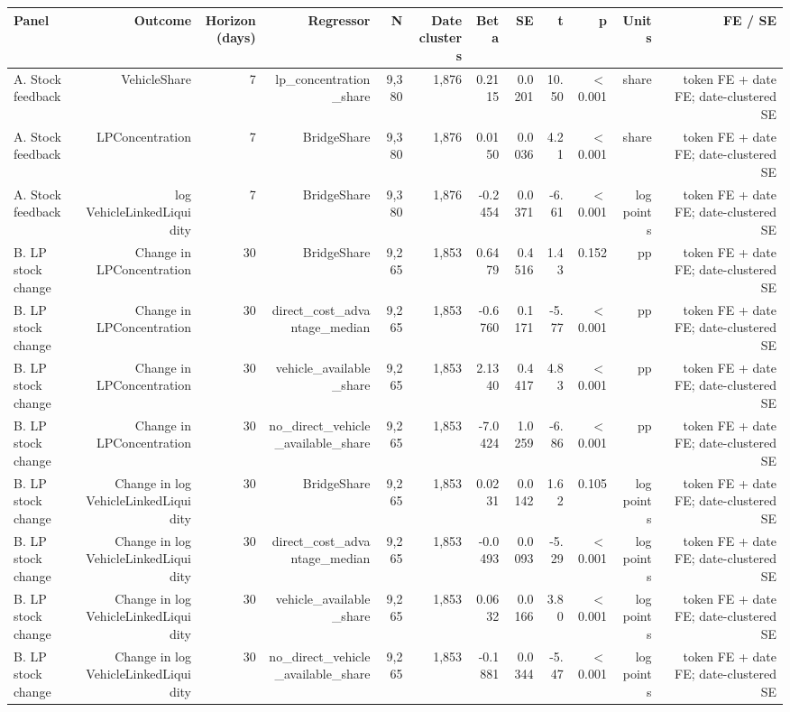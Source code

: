 \begin{tabular}{lrrrrrrrrrrr}
\toprule
Panel & Outcome & Horizon (days) & Regressor & N & Date clusters & Beta & SE & t & p & Units & FE / SE \\
\midrule
A. Stock feedback & VehicleShare & 7 & lp\_concentration\_share & 9,380 & 1,876 & 0.2115 & 0.0201 & 10.50 & \ensuremath{<}0.001 & share & token FE + date FE; date-clustered SE \\
A. Stock feedback & LPConcentration & 7 & BridgeShare & 9,380 & 1,876 & 0.0150 & 0.0036 & 4.21 & \ensuremath{<}0.001 & share & token FE + date FE; date-clustered SE \\
A. Stock feedback & log VehicleLinkedLiquidity & 7 & BridgeShare & 9,380 & 1,876 & -0.2454 & 0.0371 & -6.61 & \ensuremath{<}0.001 & log points & token FE + date FE; date-clustered SE \\
B. LP stock change & Change in LPConcentration & 30 & BridgeShare & 9,265 & 1,853 & 0.6479 & 0.4516 & 1.43 & 0.152 & pp & token FE + date FE; date-clustered SE \\
B. LP stock change & Change in LPConcentration & 30 & direct\_cost\_advantage\_median & 9,265 & 1,853 & -0.6760 & 0.1171 & -5.77 & \ensuremath{<}0.001 & pp & token FE + date FE; date-clustered SE \\
B. LP stock change & Change in LPConcentration & 30 & vehicle\_available\_share & 9,265 & 1,853 & 2.1340 & 0.4417 & 4.83 & \ensuremath{<}0.001 & pp & token FE + date FE; date-clustered SE \\
B. LP stock change & Change in LPConcentration & 30 & no\_direct\_vehicle\_available\_share & 9,265 & 1,853 & -7.0424 & 1.0259 & -6.86 & \ensuremath{<}0.001 & pp & token FE + date FE; date-clustered SE \\
B. LP stock change & Change in log VehicleLinkedLiquidity & 30 & BridgeShare & 9,265 & 1,853 & 0.0231 & 0.0142 & 1.62 & 0.105 & log points & token FE + date FE; date-clustered SE \\
B. LP stock change & Change in log VehicleLinkedLiquidity & 30 & direct\_cost\_advantage\_median & 9,265 & 1,853 & -0.0493 & 0.0093 & -5.29 & \ensuremath{<}0.001 & log points & token FE + date FE; date-clustered SE \\
B. LP stock change & Change in log VehicleLinkedLiquidity & 30 & vehicle\_available\_share & 9,265 & 1,853 & 0.0632 & 0.0166 & 3.80 & \ensuremath{<}0.001 & log points & token FE + date FE; date-clustered SE \\
B. LP stock change & Change in log VehicleLinkedLiquidity & 30 & no\_direct\_vehicle\_available\_share & 9,265 & 1,853 & -0.1881 & 0.0344 & -5.47 & \ensuremath{<}0.001 & log points & token FE + date FE; date-clustered SE \\
\bottomrule
\end{tabular}
